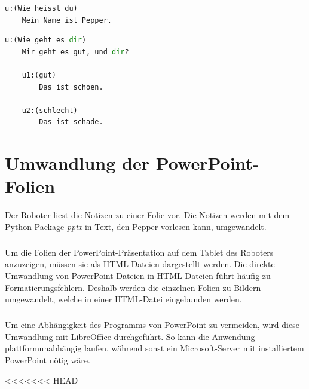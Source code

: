 \begin{lstlisting}[float, language=Python, frame=single, framexleftmargin=15pt,
style=algoBericht, label={lst:pepper-dialog}, captionpos=b, caption={Einfacher
Dialog mit Pepper}] 
u:(Wie heisst du)
	Mein Name ist Pepper.
\end{lstlisting}

\begin{lstlisting}[float, language=Python, frame=single, framexleftmargin=15pt,
style=algoBericht, label={lst:pepper-dialog-kontext}, captionpos=b,
caption={Dialog mit Pepper mit Kontext}] 
u:(Wie geht es dir)
	Mir geht es gut, und dir?
	
	u1:(gut)
		Das ist schoen.
		
	u2:(schlecht)
		Das ist schade.
\end{lstlisting}

\section{Umwandlung der PowerPoint-Folien}\label{sec:umwandlung}
Der Roboter liest die Notizen zu einer Folie vor. Die Notizen werden mit dem
Python Package \emph{pptx} in Text, den Pepper vorlesen kann, umgewandelt.

\subparagraph{}
Um die Folien der PowerPoint-Präsentation auf dem Tablet des Roboters
anzuzeigen, müssen sie als HTML-Dateien dargestellt werden. Die direkte
Umwandlung von PowerPoint-Dateien in HTML-Dateien führt häufig zu
Formatierungsfehlern. Deshalb werden die einzelnen Folien zu Bildern
umgewandelt, welche in einer HTML-Datei eingebunden werden. 

\subparagraph{}
Um eine Abhängigkeit des Programms von PowerPoint zu vermeiden, wird diese
Umwandlung mit LibreOffice durchgeführt. So kann die Anwendung
plattformunabhängig laufen, während sonst ein Microsoft-Server mit
installiertem PowerPoint nötig wäre.

<<<<<<< HEAD
